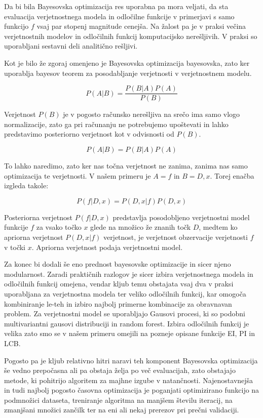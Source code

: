 \documentclass[a4paper, 12pt]{book}
\begin{document}
Da bi bila Bayesovska optimizacija res uporabna pa mora veljati, da sta evaluacija verjetnostnega modela in odločilne funkcije v primerjavi s samo funkcijo $f$ vsaj par stopenj magnitude cenejša.
Na žalost pa je v praksi večina verjetnostnih modelov in odločilnih funkcij komputacijsko nerešljivih.
V praksi so uporabljani sestavni deli analitično rešljivi. 
\par Kot je bilo že zgoraj omenjeno je Bayesovska optimizacija bayesovska, zato ker uporablja bayesov teorem za posodabljanje verjetnosti v verjetnostnem modelu.

\begin{equation}
	P(A|B) = \frac{P(B|A)P(A)}{P(B)}
\end{equation}

Verjetnost $P(B)$ je v pogosto računsko nerešljiva na srečo ima samo vlogo normalizacije, zato ga pri računanju ne potrebujemo upoštevati in lahko predstavimo posteriorno verjetnost kot v odvisnosti od $P(B)$.

\begin{equation}
	P(A|B) = P(B|A)P(A)
\end{equation}

To lahko naredimo, zato ker nas točna verjetnost ne zanima, zanima nas samo optimizacija te verjetnosti. 
V našem primeru je $A = f$ in $B = D,x$.
Torej enačba izgleda takole:

\begin{equation}
	P(f|D,x) = P(D,x|f)P(D,x)
\end{equation}

Posteriorna verjetnost $P(f|D,x)$ predstavlja posodobljeno verjetnostni model funkcije $f$ za vsako točko $x$ glede na množico že znanih točk $D$, medtem ko apriorna verjetnost $P(D,x|f)$ verjetnost, je verjetnost obzervacije verjetnosti $f$ v točki $x$.
Apriorna verjetnost podaja verjetnostni model.
\par Za konec bi dodali še eno prednost bayesovske optimizacije in sicer njeno modularnost.
 Zaradi praktičnih razlogov je sicer izbira verjetnostnega modela in odločilnih funkcij omejena, vendar kljub temu obstajata vsaj dva v praksi uporabljana za verjetnostna modela ter veliko odločilnih funkcij, kar omogoča kombiniranje le-teh in izbiro najbolj primerne kombinacije za obravnavan problem.
 Za verjetnostni model se uporabljajo Gausovi procesi, ki so podobni multivariantni gausovi distribuciji in random forest.
 Izbira odločilnih funkcij je velika zato smo se v našem primeru omejili na pozneje opisane funkcije EI, PI in LCB.
\par Pogosto pa je kljub relativno hitri naravi teh komponent Bayesovska optimizacija še vedno prepočasna ali pa obstaja želja po več evaluacijah, zato obstajajo metode, ki pohitrijo algoritem za majhne izgube v natančnosti. 
Najenostavnejša in tudi najbolj pogosto časovna optimizacija je poganjati optimizirano funkcijo na podmnožici dataseta, treniranje algoritma na manjšem številu iteracij, na zmanjšani množici zančilk ter na eni ali nekaj prerezov pri prečni validaciji.
\end{document}
